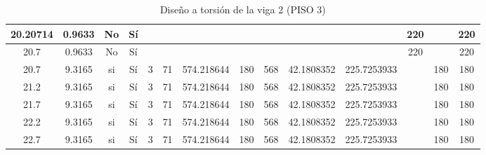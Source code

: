 \begin{table}[H]
{\begin{tabular}{|c|c|c|c|c|c|c|c|c|c|c|c|c|c|}
\hline
20.20714 & 0.9633 & No  & Sí  &     &     &     &     &     &     &     & 220 &     & 220 \bigstrut\\
\hline
20.7 & 0.9633 & No  & Sí  &     &     &     &     &     &     &     & 220 &     & 220 \bigstrut\\
\hline
20.7 & 9.3165 & si  & Sí  & 3   & 71  & 574.218644 & 180 & 568 & 42.1808352 & 225.7253933 &     & 180 & 180 \bigstrut\\
\hline
21.2 & 9.3165 & si  & Sí  & 3   & 71  & 574.218644 & 180 & 568 & 42.1808352 & 225.7253933 &     & 180 & 180 \bigstrut\\
\hline
21.7 & 9.3165 & si  & Sí  & 3   & 71  & 574.218644 & 180 & 568 & 42.1808352 & 225.7253933 &     & 180 & 180 \bigstrut\\
\hline
22.2 & 9.3165 & si  & Sí  & 3   & 71  & 574.218644 & 180 & 568 & 42.1808352 & 225.7253933 &     & 180 & 180 \bigstrut\\
\hline
22.7 & 9.3165 & si  & Sí  & 3   & 71  & 574.218644 & 180 & 568 & 42.1808352 & 225.7253933 &     & 180 & 180 \bigstrut\\
\hline
\end{tabular}%


  }
      \caption{Diseño a torsión de la viga 2 (PISO 3) }
  \label{tab:T VG2 P3 }%
\end{table}%
